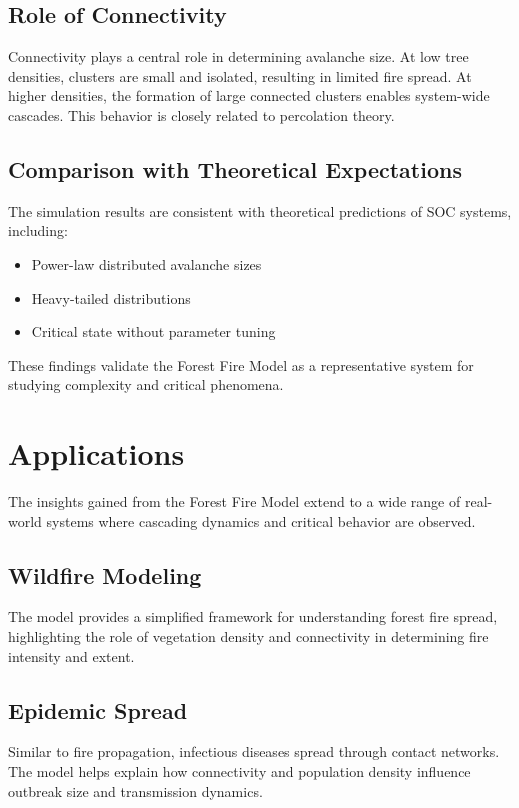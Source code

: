 \documentclass[12pt,a4paper]{article}
\begin{document}
\subsection{Role of Connectivity}

Connectivity plays a central role in determining avalanche size. At low tree densities, clusters are small and isolated, resulting in limited fire spread. At higher densities, the formation of large connected clusters enables system-wide cascades. This behavior is closely related to percolation theory.

\subsection{Comparison with Theoretical Expectations}

The simulation results are consistent with theoretical predictions of SOC systems, including:
\begin{itemize}
\item Power-law distributed avalanche sizes
\item Heavy-tailed distributions
\item Critical state without parameter tuning
\end{itemize}

These findings validate the Forest Fire Model as a representative system for studying complexity and critical phenomena.

\section{Applications}

The insights gained from the Forest Fire Model extend to a wide range of real-world systems where cascading dynamics and critical behavior are observed.

\subsection{Wildfire Modeling}

The model provides a simplified framework for understanding forest fire spread, highlighting the role of vegetation density and connectivity in determining fire intensity and extent.

\subsection{Epidemic Spread}

Similar to fire propagation, infectious diseases spread through contact networks. The model helps explain how connectivity and population density influence outbreak size and transmission dynamics.
\end{document}
